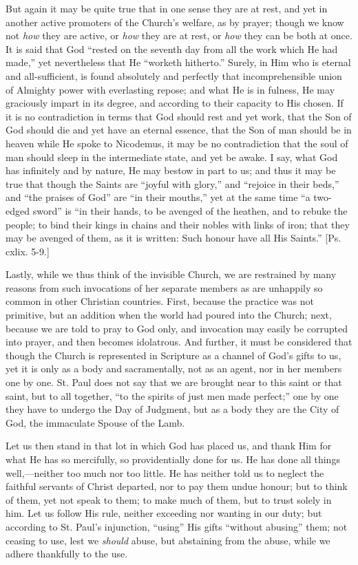 But again it may be quite true that in one sense they are at rest,
and yet in another active promoters of the Church's welfare, as by
prayer; though we know not \emph{how} they are active, or \emph{how}
they are at rest, or \emph{how} they can be both at once. It is said
that God ``rested on the seventh day from all the work which He
had made,'' yet nevertheless that He ``worketh hitherto.''
Surely, in Him who is eternal and all-sufficient, is found absolutely
and perfectly that incomprehensible union of Almighty power with
everlasting repose; and what He is in fulness, He may graciously
impart in its degree, and according to their capacity to His chosen.
If it is no contradiction in terms that God should rest and yet work,
that the Son of God should die and yet have an eternal essence, that
the Son of man should be in heaven while He spoke to Nicodemus, it may
be no contradiction that the soul of man should sleep in the
intermediate state, and yet be awake. I say, what God has infinitely
and by nature, He may bestow in part to us; and thus it may be true
that though the Saints are ``joyful with glory,'' and
``rejoice in their beds,'' and ``the praises of God''
are ``in their mouths,'' yet at the same time ``a
two-edged sword'' is ``in their hands, to be avenged of the
heathen, and to rebuke the people; to bind their kings in chains and
their nobles with links of iron; that they may be avenged of them, as
it is written: Such honour have all His Saints.'' [Ps. cxlix.
5-9.]

Lastly, while we thus think of the invisible Church, we are
restrained by many reasons from such invocations of her separate
members as are unhappily so common in other Christian countries.
First, because the practice was not primitive, but an addition when
the world had poured into the Church; next, because we are told to
pray to God only, and invocation may easily be corrupted into prayer,
and then becomes idolatrous. And further, it must be considered that
though the Church is represented in Scripture as a channel of God's
gifts to us, yet it is only as a body and sacramentally, not as an
agent, nor in her members one by one. St. Paul does not say that we
are brought near to this saint or that saint, but to all together,
``to the spirits of just men made perfect;'' one by one they
have to undergo the Day of Judgment, but as a body they are the City
of God, the immaculate Spouse of the Lamb.

Let us then stand in that lot in which God has placed us, and thank
Him for what He has so mercifully, so providentially done for us. He
has done all things well,—neither too much nor too little. He has
neither told us to neglect the faithful servants of Christ departed,
nor to pay them undue honour; but to think of them, yet not speak to
them; to make much of them, but to trust solely in him. Let us follow
His rule, neither exceeding nor wanting in our duty; but according to
St. Paul's injunction, ``using'' His gifts ``without
abusing'' them; not ceasing to use, lest we \emph{should} abuse,
but abstaining from the abuse, while we adhere thankfully to the use.

